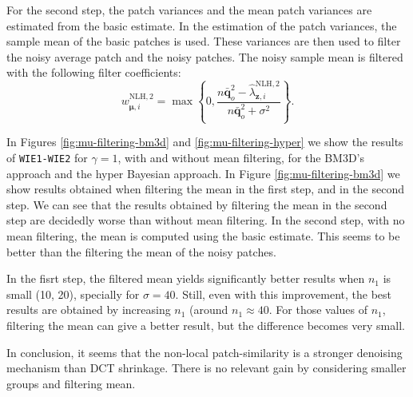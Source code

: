 \documentclass{ipol}
\newcommand{\ma}[1]{\boldsymbol{#1}}
\begin{document}
For the second step, the patch variances and the mean patch variances are estimated
from the basic estimate. In the estimation of the patch variances, the sample mean 
of the basic patches is used. These variances are then used to filter the
noisy average patch and the noisy patches. The noisy sample mean is filtered with 
the following filter coefficients:
\[
	w^{\text{NLH},2}_{\ma\mu,i} =
		\max\left\{0, \frac{n\bar{\ma q}_o^2 - 
		\hat \lambda_{\ma z,i}^{\text{NLH},2}}{n\bar{\ma q}_o^2 + \sigma^2}\right\}.
\]

In Figures \ref{fig:mu-filtering-bm3d} and \ref{fig:mu-filtering-hyper} we show 
the results of \texttt{WIE1-WIE2} for $\gamma = 1$, with and without mean filtering,
for the BM3D's approach and the hyper Bayesian approach.
In Figure \ref{fig:mu-filtering-bm3d} we show results obtained when filtering
the mean in the first step, and in the second step. We can see that the results
obtained by filtering the mean in the second step are decidedly worse than without
mean filtering. In the second step, with no mean filtering, the mean is
computed using the basic estimate. This seems to be better than the filtering the
mean of the noisy patches.

In the fisrt step, the filtered mean yields significantly better results when
$n_1$ is small (10, 20), specially for $\sigma = 40$. Still, even with this improvement, 
the best results are obtained by increasing $n_1$ (around $n_1 \approx 40$. For those values
of $n_1$, filtering the mean can give a better result, but the difference becomes very small. 

In conclusion, it seems that the non-local patch-similarity is a stronger denoising 
mechanism than DCT shrinkage. There is no relevant gain by considering smaller groups and filtering
mean.
\end{document}
